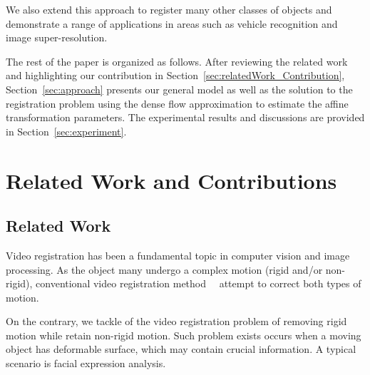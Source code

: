 \documentclass[10pt,journal]{IEEEtran}
\begin{document}
\textcolor[rgb]{1,0,0}{
We also extend this approach to register many other classes of objects and demonstrate a range of applications in areas such as vehicle recognition and image super-resolution. 
}

The rest of the paper is organized as follows. After reviewing the related work and highlighting our contribution in Section~\ref{sec:relatedWork_Contribution}, Section~\ref{sec:approach} presents our general model as well as the solution to the registration problem using the dense flow approximation to estimate the affine transformation parameters. The experimental results and discussions are provided in Section~\ref{sec:experiment}.


\section{\label{sec:relatedWork_Contribution}Related Work and Contributions}

\subsection{\label{sec:related_work}Related Work}

Video registration has been a fundamental topic in computer vision and image processing. As the object many undergo a complex motion (rigid and/or non-rigid), conventional video registration method~\cite{Uenohara95}~\cite{Caspi_PAMI02} attempt to correct both types of motion.

On the contrary, we tackle of the video registration problem of removing rigid motion while retain non-rigid motion. Such problem exists occurs when a moving object has deformable surface, which may contain crucial information. A typical scenario is facial expression analysis.
\end{document}

